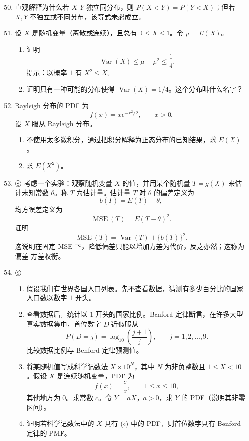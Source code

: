 \documentclass[UTF8, 12pt, fontset=fandol, oneside]{ctexart}
\begin{document}
\begin{enumerate}
  \setcounter{enumi}{49}
  \item 直观解释为什么若 $X,Y$ 独立同分布，则 $P(X<Y)=P(Y<X)$；但若 $X,Y$ 不独立或不同分布，该等式未必成立。

  \item 设 $X$ 是随机变量（离散或连续），且总有 $0\le X\le1$。令 $\mu=E(X)$。
  \begin{enumerate}
    \item 证明
    \[
      \operatorname{Var}(X)\le \mu-\mu^2\le \frac14.
    \]
    提示：以概率 $1$ 有 $X^2\le X$。
    \item 证明只有一种可能的分布使得 $\operatorname{Var}(X)=1/4$。这个分布叫什么名字？
  \end{enumerate}

  \item Rayleigh 分布的 PDF 为
  \[
    f(x)=xe^{-x^2/2},\qquad x>0.
  \]
  设 $X$ 服从 Rayleigh 分布。
  \begin{enumerate}
    \item 不使用太多微积分，通过把积分解释为正态分布的已知结果，求 $E(X)$。
    \item 求 $E(X^2)$。
  \end{enumerate}

  \item $\circledS$ 考虑一个实验：观察随机变量 $X$ 的值，并用某个随机量 $T=g(X)$ 来估计未知常数 $\theta$。称 $T$ 为估计量。估计量 $T$ 对 $\theta$ 的偏差定义为
  \[
    b(T)=E(T)-\theta,
  \]
  均方误差定义为
  \[
    \operatorname{MSE}(T)=E(T-\theta)^2.
  \]
  证明
  \[
    \operatorname{MSE}(T)=\operatorname{Var}(T)+\{b(T)\}^2.
  \]
  这说明在固定 MSE 下，降低偏差只能以增加方差为代价，反之亦然；这称为偏差-方差权衡。

  \item $\circledS$
  \begin{enumerate}
    \item 假设我们有世界各国人口列表。先不查看数据，猜测有多少百分比的国家人口数以数字 $1$ 开头。
    \item 查看数据后，统计以 $1$ 开头的国家比例。Benford 定律断言，在许多大型真实数据集中，首位数字 $D$ 近似服从
    \[
      P(D=j)=\log_{10}\left(\frac{j+1}{j}\right),\qquad j=1,2,\ldots,9.
    \]
    比较数据比例与 Benford 定律预测值。
    \item 将某随机值写成科学记数法 $X\times10^N$，其中 $N$ 为非负整数且 $1\le X<10$。假设 $X$ 是连续随机变量，PDF 为
    \[
      f(x)=\frac{c}{x},\qquad 1\le x\le10,
    \]
    其他地方为 $0$。求常数 $c$。令 $Y=aX$，$a>0$，求 $Y$ 的 PDF（说明其非零区间）。
    \item 证明若科学记数法中的 $X$ 具有 (c) 中的 PDF，则首位数字具有 Benford 定律的 PMF。
  \end{enumerate}


\end{enumerate}
\end{document}

